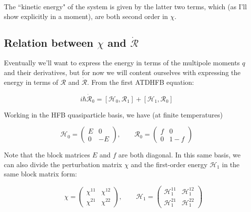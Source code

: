 \noindent The ``kinetic energy" of the system is given by the latter two terms, which (as I'll show explicitly in a moment), are both second order in $\chi$.

\subsection{Relation between $\chi$ and $\dot{\mathcal{R}}$}\label{sect:chi-rdot}

Eventually we'll want to express the energy in terms of the multipole moments $q$ and their derivatives, but for now we will content ourselves with expressing the energy in terms of $\mathcal{R}$ and $\dot{\mathcal{R}}$. From the first ATDHFB equation:

\begin{equation*}
i\hbar\mathcal{\dot{R}}_0 = \left[\mathcal{H}_0, \mathcal{R}_1\right] + \left[\mathcal{H}_1, \mathcal{R}_0\right]
\end{equation*}

Working in the HFB quasiparticle basis, we have (at finite temperatures)

\begin{equation*}
\mathcal{H}_0 = 
\left(\begin{array}{cc}
E & 0 \\
0 & -E
\end{array}\right), 
\qquad \mathcal{R}_0 = 
\left(\begin{array}{cc}
f & 0 \\
0 & 1-f
\end{array}\right)
\end{equation*}

\noindent Note that the block matrices $E$ and $f$ are both diagonal. In this same basis, we can also divide the perturbation matrix $\chi$ and the first-order energy $\mathcal{H}_1$ in the same block matrix form:

\begin{equation*}
\qquad \chi = 
\left(\begin{array}{cc}
\chi^{11} & \chi^{12} \\
\chi^{21} & \chi^{22}
\end{array}\right),
\qquad \mathcal{H}_1 = 
\left(\begin{array}{cc}
\mathcal{H}_1^{11} & \mathcal{H}_1^{12} \\
\mathcal{H}_1^{21} & \mathcal{H}_1^{22}
\end{array}\right)
\end{equation*}

